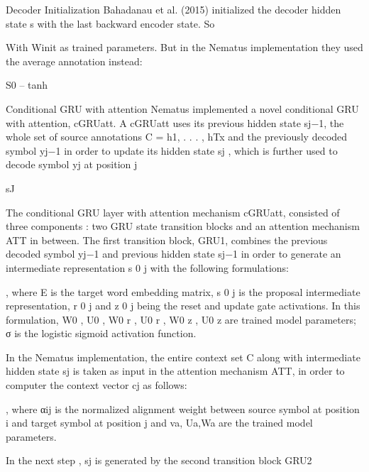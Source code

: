 Decoder Initialization	Bahadanau et al. (2015) initialized the decoder hidden state s with the last backward encoder state.
So




With Winit as trained parameters. But in the Nematus implementation they used the average annotation instead:



S0 – tanh


Conditional GRU with attention Nematus implemented a novel conditional GRU with attention, cGRUatt. A cGRUatt uses its previous hidden state sj−1, the whole set of source annotations C = {h1, . . . , hTx} and the previously decoded symbol yj−1 in order to update its hidden state sj , which is further used to decode symbol yj at position j

sJ



The conditional GRU layer with attention mechanism cGRUatt, consisted of three components : two GRU state transition blocks and an attention mechanism ATT in between. The first transition block, GRU1, combines the previous decoded symbol yj−1 and previous hidden state sj−1 in order to generate an intermediate representation s 0 j with the following formulations:











, where E is the target word embedding matrix, s 0 j is the proposal intermediate representation, r 0 j and z 0 j being the reset and update gate activations. In this formulation, W0 , U0 , W0 r , U0 r , W0 z , U0 z are trained model parameters; σ is the logistic sigmoid activation function.

In the Nematus implementation, the entire context set C along with intermediate hidden state sj is taken as input in the attention mechanism ATT, in order to computer the context vector cj as follows:











, where αij is the normalized alignment weight between source symbol at position i and target symbol at position j and va, Ua,Wa are the trained model parameters.

In the next step , sj is generated by the second transition block GRU2 

